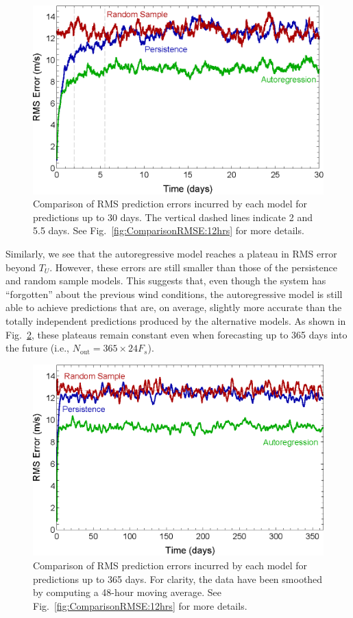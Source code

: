 \documentclass[11pt, oneside]{article}
\newcommand{\figref}[1]{Fig.~\ref{#1}}
\begin{document}
\begin{figure}[htb]
\centering
\includegraphics[width=0.7\columnwidth]{figures/ComparisonRMSPredictionError_30days}
\caption{Comparison of RMS prediction errors incurred by each model for predictions up to 30 days.
The vertical dashed lines indicate 2 and 5.5 days.
See \figref{fig:ComparisonRMSE:12hrs} for more details.}
\label{fig:ComparisonRMSE:30days}
\end{figure}

Similarly, we see that the autoregressive model reaches a plateau in RMS error beyond $T_U$.
However, these errors are still smaller than those of the persistence and random sample models.
This suggests that, even though the system has ``forgotten'' about the previous wind conditions, the autoregressive model is still able to achieve predictions that are, on average, slightly more accurate than the totally independent predictions produced by the alternative models.
As shown in \figref{fig:ComparisonRMSE:365days}, these plateaus remain constant even when forecasting up to 365 days into the future (i.e., $N_\text{out} = 365 \times 24 F_s$).

\begin{figure}[htb]
\centering
\includegraphics[width=0.7\columnwidth]{figures/ComparisonRMSPredictionError_365days}
\caption{Comparison of RMS prediction errors incurred by each model for predictions up to 365 days.
For clarity, the data have been smoothed by computing a 48-hour moving average.
See \figref{fig:ComparisonRMSE:12hrs} for more details.}
\label{fig:ComparisonRMSE:365days}
\end{figure}
\end{document}
